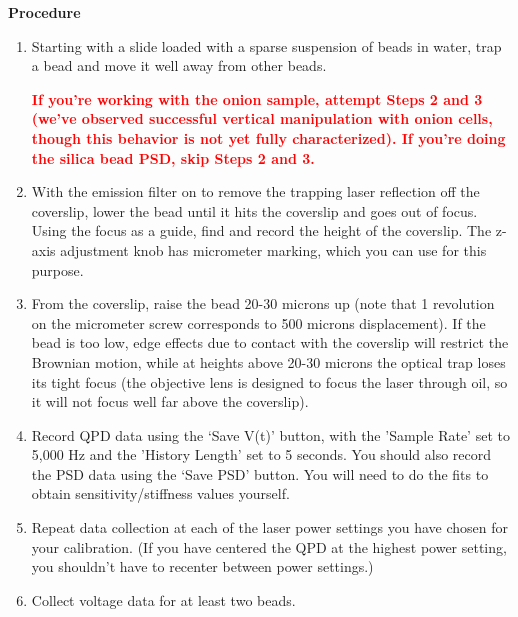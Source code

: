 \documentclass{../lab}
\begin{document}
\textbf{Procedure}

\begin{enumerate}
    \item Starting with a slide loaded with a sparse suspension of beads in water, trap a bead and move it well away from other beads.

\textbf{\textcolor{red}{If you’re working with the onion sample, attempt Steps 2 and 3 (we’ve observed successful vertical manipulation with onion cells, though this behavior is not yet fully characterized). If you’re doing the silica bead PSD, skip Steps 2 and 3.}}
    \item With the emission filter on to remove the trapping laser reflection off the coverslip, lower the bead until it hits the coverslip and goes out of focus. Using the focus as a guide, find and record the height of the coverslip. The z-axis adjustment knob has micrometer marking, which you can use for this purpose.

    \item From the coverslip, raise the bead 20-30  microns up (note that 1 revolution on the micrometer screw corresponds to 500 microns displacement). If the bead is too low, edge effects due to contact with the coverslip will restrict the Brownian motion, while at heights above 20-30 microns the optical trap loses its tight focus (the objective lens is designed to focus the laser through oil, so it will not focus well far above the coverslip).

    \item Record QPD data using the `Save V(t)' button, with the 'Sample Rate' set to 5,000 Hz and the 'History Length' set to 5 seconds. You should also record the PSD data using the `Save PSD' button. You will need to do the fits to obtain sensitivity/stiffness values yourself. %

    \item Repeat data collection at each of the laser power settings you have chosen for your calibration. (If you have centered the QPD at the highest power setting, you shouldn't have to recenter between power settings.)

    \item Collect voltage data for at least two beads.

\end{enumerate}
\end{document}
